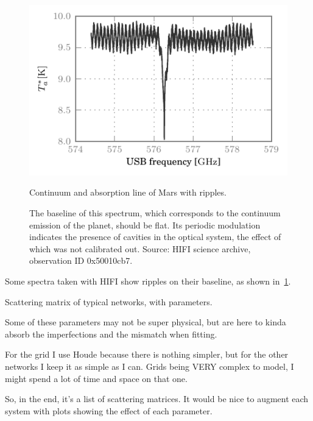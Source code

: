 \begin{figure}[htbp]
    \centering
    \includegraphics[width=.8\textwidth]{mars_50010cb7_WBSH_USB}
    \caption{Continuum and absorption line of Mars with ripples.}
    \caption*{
        The baseline of this spectrum, which corresponds to the continuum emission of the planet, should be flat.
        Its periodic modulation indicates the presence of cavities in the optical system, the effect of which was not calibrated out.
        Source: HIFI science archive, observation ID 0x50010cb7.
    }
    \label{fig:mars_50010cb7_WBSH_USB_chp2}
\end{figure}

Some spectra taken with HIFI show ripples on their baseline, as shown in~\cref{fig:mars_50010cb7_WBSH_USB_chp2}.




\label{sec:chapter2_4}
\label{sec:generic_networks}

Scattering matrix of typical networks, with parameters.

Some of these parameters may not be super physical, but are here to kinda absorb the imperfections and the mismatch when fitting.

For the grid I use Houde \cite{houde_2001} because there is nothing simpler, but for the other networks I keep it as simple as I can.
Grids being VERY complex to model, I might spend a lot of time and space on that one.

So, in the end, it's a list of scattering matrices.  It would be nice to augment each system with plots showing the effect of each parameter.




